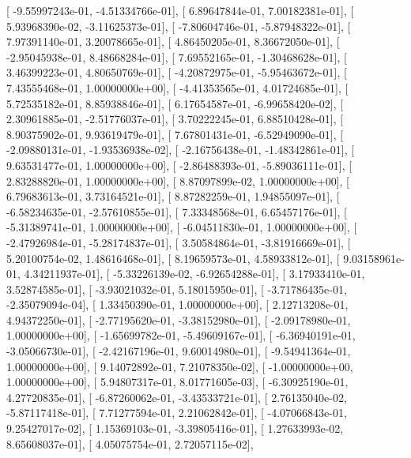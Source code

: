 \documentclass{article}
\begin{document}
       [ -9.55997243e-01,  -4.51334766e-01],
       [  6.89647844e-01,   7.00182381e-01],
       [  5.93968390e-02,  -3.11625373e-01],
       [ -7.80604746e-01,  -5.87948322e-01],
       [  7.97391140e-01,   3.20078665e-01],
       [  4.86450205e-01,   8.36672050e-01],
       [ -2.95045938e-01,   8.48668284e-01],
       [  7.69552165e-01,  -1.30468628e-01],
       [  3.46399223e-01,   4.80650769e-01],
       [ -4.20872975e-01,  -5.95463672e-01],
       [  7.43555468e-01,   1.00000000e+00],
       [ -4.41353565e-01,   4.01724685e-01],
       [  5.72535182e-01,   8.85938846e-01],
       [  6.17654587e-01,  -6.99658420e-02],
       [  2.30961885e-01,  -2.51776037e-01],
       [  3.70222245e-01,   6.88510428e-01],
       [  8.90375902e-01,   9.93619479e-01],
       [  7.67801431e-01,  -6.52949090e-01],
       [ -2.09880131e-01,  -1.93536938e-02],
       [ -2.16756438e-01,  -1.48342861e-01],
       [  9.63531477e-01,   1.00000000e+00],
       [ -2.86488393e-01,  -5.89036111e-01],
       [  2.83288820e-01,   1.00000000e+00],
       [  8.87097899e-02,   1.00000000e+00],
       [  6.79683613e-01,   3.73164521e-01],
       [  8.87282259e-01,   1.94855097e-01],
       [ -6.58234635e-01,  -2.57610855e-01],
       [  7.33348568e-01,   6.65457176e-01],
       [ -5.31389741e-01,   1.00000000e+00],
       [ -6.04511830e-01,   1.00000000e+00],
       [ -2.47926984e-01,  -5.28174837e-01],
       [  3.50584864e-01,  -3.81916669e-01],
       [  5.20100754e-02,   1.48616468e-01],
       [  8.19659573e-01,   4.58933812e-01],
       [  9.03158961e-01,   4.34211937e-01],
       [ -5.33226139e-02,  -6.92654288e-01],
       [  3.17933410e-01,   3.52874585e-01],
       [ -3.93021032e-01,   5.18015950e-01],
       [ -3.71786435e-01,  -2.35079094e-04],
       [  1.33450390e-01,   1.00000000e+00],
       [  2.12713208e-01,   4.94372250e-01],
       [ -2.77195620e-01,  -3.38152980e-01],
       [ -2.09178980e-01,   1.00000000e+00],
       [ -1.65699782e-01,  -5.49609167e-01],
       [ -6.36940191e-01,  -3.05066730e-01],
       [ -2.42167196e-01,   9.60014980e-01],
       [ -9.54941364e-01,   1.00000000e+00],
       [  9.14072892e-01,   7.21078350e-02],
       [ -1.00000000e+00,   1.00000000e+00],
       [  5.94807317e-01,   8.01771605e-03],
       [ -6.30925190e-01,   4.27720835e-01],
       [ -6.87260062e-01,  -3.43533721e-01],
       [  2.76135040e-02,  -5.87117418e-01],
       [  7.71277594e-01,   2.21062842e-01],
       [ -4.07066843e-01,   9.25427017e-02],
       [  1.15369103e-01,  -3.39805416e-01],
       [  1.27633993e-02,   8.65608037e-01],
       [  4.05075754e-01,   2.72057115e-02],
\end{document}

